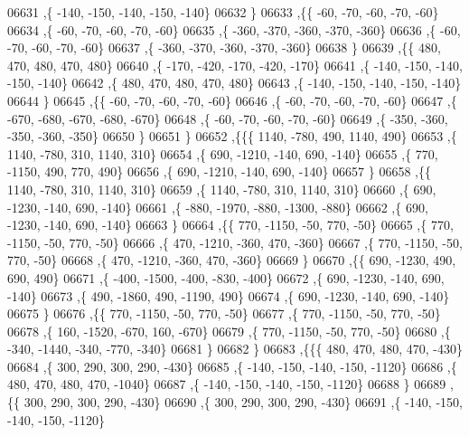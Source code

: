 \begin{DoxyCode}
06631     ,\{  -140,  -150,  -140,  -150,  -140\}
06632     \}
06633    ,\{\{   -60,   -70,   -60,   -70,   -60\}
06634     ,\{   -60,   -70,   -60,   -70,   -60\}
06635     ,\{  -360,  -370,  -360,  -370,  -360\}
06636     ,\{   -60,   -70,   -60,   -70,   -60\}
06637     ,\{  -360,  -370,  -360,  -370,  -360\}
06638     \}
06639    ,\{\{   480,   470,   480,   470,   480\}
06640     ,\{  -170,  -420,  -170,  -420,  -170\}
06641     ,\{  -140,  -150,  -140,  -150,  -140\}
06642     ,\{   480,   470,   480,   470,   480\}
06643     ,\{  -140,  -150,  -140,  -150,  -140\}
06644     \}
06645    ,\{\{   -60,   -70,   -60,   -70,   -60\}
06646     ,\{   -60,   -70,   -60,   -70,   -60\}
06647     ,\{  -670,  -680,  -670,  -680,  -670\}
06648     ,\{   -60,   -70,   -60,   -70,   -60\}
06649     ,\{  -350,  -360,  -350,  -360,  -350\}
06650     \}
06651    \}
06652   ,\{\{\{  1140,  -780,   490,  1140,   490\}
06653     ,\{  1140,  -780,   310,  1140,   310\}
06654     ,\{   690, -1210,  -140,   690,  -140\}
06655     ,\{   770, -1150,   490,   770,   490\}
06656     ,\{   690, -1210,  -140,   690,  -140\}
06657     \}
06658    ,\{\{  1140,  -780,   310,  1140,   310\}
06659     ,\{  1140,  -780,   310,  1140,   310\}
06660     ,\{   690, -1230,  -140,   690,  -140\}
06661     ,\{  -880, -1970,  -880, -1300,  -880\}
06662     ,\{   690, -1230,  -140,   690,  -140\}
06663     \}
06664    ,\{\{   770, -1150,   -50,   770,   -50\}
06665     ,\{   770, -1150,   -50,   770,   -50\}
06666     ,\{   470, -1210,  -360,   470,  -360\}
06667     ,\{   770, -1150,   -50,   770,   -50\}
06668     ,\{   470, -1210,  -360,   470,  -360\}
06669     \}
06670    ,\{\{   690, -1230,   490,   690,   490\}
06671     ,\{  -400, -1500,  -400,  -830,  -400\}
06672     ,\{   690, -1230,  -140,   690,  -140\}
06673     ,\{   490, -1860,   490, -1190,   490\}
06674     ,\{   690, -1230,  -140,   690,  -140\}
06675     \}
06676    ,\{\{   770, -1150,   -50,   770,   -50\}
06677     ,\{   770, -1150,   -50,   770,   -50\}
06678     ,\{   160, -1520,  -670,   160,  -670\}
06679     ,\{   770, -1150,   -50,   770,   -50\}
06680     ,\{  -340, -1440,  -340,  -770,  -340\}
06681     \}
06682    \}
06683   ,\{\{\{   480,   470,   480,   470,  -430\}
06684     ,\{   300,   290,   300,   290,  -430\}
06685     ,\{  -140,  -150,  -140,  -150, -1120\}
06686     ,\{   480,   470,   480,   470, -1040\}
06687     ,\{  -140,  -150,  -140,  -150, -1120\}
06688     \}
06689    ,\{\{   300,   290,   300,   290,  -430\}
06690     ,\{   300,   290,   300,   290,  -430\}
06691     ,\{  -140,  -150,  -140,  -150, -1120\}

\end{DoxyCode}
